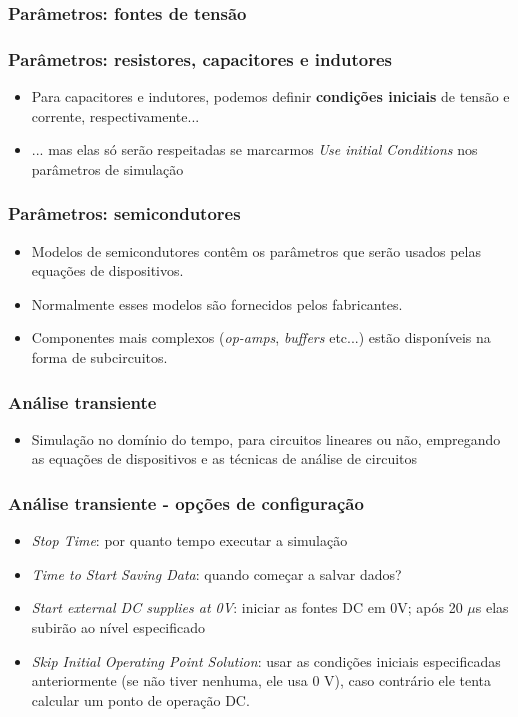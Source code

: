 \documentclass{beamer}
\begin{document}
\begin{frame}
\frametitle{Parâmetros: fontes de tensão}
\end{frame}

\begin{frame}
\frametitle{Parâmetros: resistores, capacitores e indutores}
\begin{itemize}
\item{Para capacitores e indutores, podemos definir \textbf{condições iniciais} de tensão e corrente, respectivamente...}
\item{... mas elas só serão respeitadas se marcarmos \textit{Use initial Conditions} nos parâmetros de simulação}
\end{itemize}
\end{frame}

\begin{frame}
\frametitle{Parâmetros: semicondutores}
\begin{itemize}
\item{Modelos de semicondutores contêm os parâmetros que serão usados pelas equações de dispositivos.}
\item{Normalmente esses modelos são fornecidos pelos fabricantes.}
\item{Componentes mais complexos (\textit{op-amps}, \textit{buffers} etc...) estão disponíveis na forma de subcircuitos.}
\end{itemize}
\end{frame}


\begin{frame}
\frametitle{Análise transiente}
\begin{itemize}
\item{Simulação no domínio do tempo, para circuitos lineares ou não, empregando as equações de dispositivos e as técnicas de análise de circuitos}
\end{itemize}
\end{frame}

\begin{frame}
\frametitle{Análise transiente - opções de configuração}
\begin{itemize} 
\item \textit{Stop Time}: por quanto tempo executar a simulação
\item \textit{Time to Start Saving Data}: quando começar a salvar dados?
\item \textit{Start external DC supplies at 0V}: iniciar as fontes DC em 0V; após 20 $\mu$s elas subirão ao nível especificado
\item \textit{Skip Initial Operating Point Solution}: usar as condições iniciais especificadas anteriormente (se não tiver nenhuma, ele usa 0 V), caso contrário ele tenta calcular um ponto de operação DC.
\end{itemize}
\end{frame}
\end{document}
